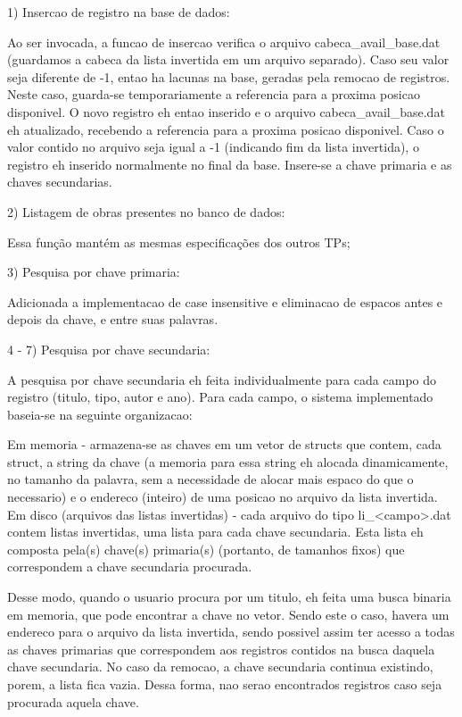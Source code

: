 \documentclass{article}
\begin{document}
1) Insercao de registro na base de dados:

Ao ser invocada, a funcao de insercao verifica o arquivo cabeca_avail_base.dat (guardamos a cabeca da lista invertida em um arquivo separado). 
Caso seu valor seja diferente de -1, entao ha lacunas na base, geradas pela remocao de registros.
Neste caso, guarda-se temporariamente a referencia para a proxima posicao disponivel. O novo registro eh entao inserido e o arquivo cabeca_avail_base.dat eh atualizado, recebendo a referencia para a proxima posicao disponivel.
Caso o valor contido no arquivo seja igual a -1 (indicando fim da lista invertida), o registro eh inserido normalmente no final da base.
Insere-se a chave primaria e as chaves secundarias.



2) Listagem de obras presentes no banco de dados:

Essa função mantém as mesmas especificações dos outros TPs;



3) Pesquisa por chave primaria:

Adicionada a implementacao de case insensitive e eliminacao de espacos antes e depois da chave, e entre suas palavras.



4 - 7) Pesquisa por chave secundaria:

A pesquisa por chave secundaria eh feita individualmente para cada campo do registro (titulo, tipo, autor e ano). Para cada campo, o sistema implementado baseia-se na seguinte organizacao:

Em memoria - armazena-se as chaves em um vetor de structs que contem, cada struct, a string da chave (a memoria para essa string eh alocada dinamicamente, no tamanho da palavra, sem a necessidade de alocar mais espaco do que o necessario) e o endereco (inteiro) de uma posicao no arquivo da lista invertida.
Em disco (arquivos das listas invertidas) - cada arquivo do tipo li_<campo>.dat contem listas invertidas, uma lista para cada chave secundaria. Esta lista eh composta pela(s) chave(s) primaria(s) (portanto, de tamanhos fixos) que correspondem a chave secundaria procurada.

Desse modo, quando o usuario procura por um titulo, eh feita uma busca binaria em memoria, que pode encontrar a chave no vetor. Sendo este o caso, havera um endereco para o arquivo da lista invertida, sendo possivel assim ter acesso a todas as chaves primarias que correspondem aos registros contidos na busca daquela chave secundaria.
No caso da remocao, a chave secundaria continua existindo, porem, a lista fica vazia. Dessa forma, nao serao encontrados registros caso seja procurada aquela chave.
\end{document}

